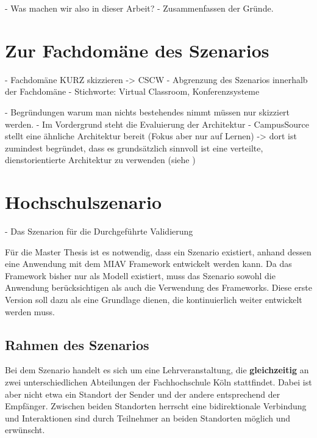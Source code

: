  - Was machen wir also in dieser Arbeit?
  - Zusammenfassen der Gründe.



\section{Zur Fachdomäne des Szenarios} %
\label{sec:zur_fachdomaene_des_szenarios}

- Fachdomäne KURZ skizzieren -> CSCW
- Abgrenzung des Szenarios innerhalb der Fachdomäne
- Stichworte: Virtual Classroom, Konferenzsysteme

- Begründungen warum man nichts bestehendes nimmt müssen nur skizziert werden.
  - Im Vordergrund steht die Evaluierung der Architektur
  - CampusSource stellt eine ähnliche Architektur bereit (Fokus aber nur auf Lernen) -> dort ist zumindest begründet, dass es grundsätzlich sinnvoll ist eine verteilte, dienstorientierte Architektur zu verwenden (siehe \citep{campus_source})


\section{Hochschulszenario} %
\label{sec:hochschulszenario}

  - Das Szenarion für die Durchgeführte Validierung

  Für die Master Thesis ist es notwendig, dass ein Szenario existiert, anhand dessen eine Anwendung mit dem MIAV Framework entwickelt werden kann. Da das Framework bisher nur als Modell existiert, muss das Szenario sowohl die Anwendung berücksichtigen als auch die Verwendung des Frameworks. Diese erste Version soll dazu als eine Grundlage dienen, die kontinuierlich weiter entwickelt werden muss.

\subsection{Rahmen des Szenarios} %
\label{ssec:rahmen_des_szenarios}

  Bei dem Szenario handelt es sich um eine Lehrveranstaltung, die \textbf{gleichzeitig} an zwei unterschiedlichen Abteilungen der Fachhochschule Köln stattfindet. Dabei ist aber nicht etwa ein Standort der Sender und der andere entsprechend der Empfänger. Zwischen beiden Standorten herrscht eine bidirektionale Verbindung und Interaktionen sind durch Teilnehmer an beiden Standorten möglich und erwünscht.

